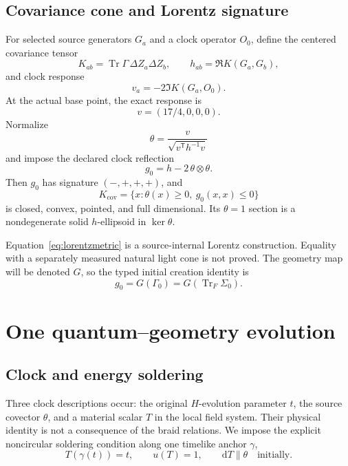 \documentclass[11pt]{article}
\theoremstyle{definition}
\theoremstyle{remark}
\newcommand{\Tr}{\operatorname{Tr}}
\newcommand{\dd}{\mathrm{d}}
\newcommand{\Ker}{\operatorname{ker}}
\begin{document}
\subsection{Covariance cone and Lorentz signature}

For selected source generators $G_a$ and a clock operator $O_0$, define the centered covariance tensor
\begin{equation}
  K_{ab}=\Tr\Gamma\,\Delta Z_a\Delta Z_b,
  \qquad h_{ab}=\Re K(G_a,G_b),
\end{equation}
and clock response
\begin{equation}
  v_a=-2\Im K(G_a,O_0).
\end{equation}
At the actual base point, the exact response is
\begin{equation}
  v=(17/4,0,0,0).
\end{equation}
Normalize
\begin{equation}
  \theta=\frac{v}{\sqrt{v^{\mathsf T}h^{-1}v}}
\end{equation}
and impose the declared clock reflection
\begin{equation}\label{eq:lorentzmetric}
  g_0=h-2\,\theta\otimes\theta.
\end{equation}
Then $g_0$ has signature $(-,+,+,+)$, and
\begin{equation}
  K_{\mathrm{cov}}=\{x:\theta(x)\ge0,\ g_0(x,x)\le0\}
\end{equation}
is closed, convex, pointed, and full dimensional. Its $\theta=1$ section is a nondegenerate solid $h$-ellipsoid in $\Ker\theta$.

Equation~\eqref{eq:lorentzmetric} is a source-internal Lorentz construction. Equality with a separately measured natural light cone is not proved. The geometry map will be denoted $G$, so the typed initial creation identity is
\begin{equation}\label{eq:creation}
  g_0=G(\Gamma_0)=G(\Tr_F\Sigma_0).
\end{equation}

\section{One quantum--geometry evolution}

\subsection{Clock and energy soldering}

Three clock descriptions occur: the original $H$-evolution parameter $t$, the source covector $\theta$, and a material scalar $T$ in the local field system. Their physical identity is not a consequence of the braid relations. We impose the explicit noncircular soldering condition along one timelike anchor $\gamma$,
\begin{equation}\label{eq:clock}
  T(\gamma(t))=t,\qquad u(T)=1,\qquad \dd T\parallel\theta\quad\text{initially}.
\end{equation}
\end{document}
